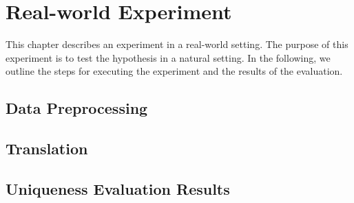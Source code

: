 \chapter{Real-world Experiment}
\label{ch:Real_Experiment}


This chapter describes an experiment in a real-world setting. The purpose of this experiment is to test the hypothesis in a natural setting. In the following, we outline the steps for executing the
experiment and the results of the evaluation.

\section{Data Preprocessing}
\label{sec:Real_Experiment:Preprocessing}





\section{Translation}
\label{sec:Real_Experiment:Translation}


\section{Uniqueness Evaluation Results}
\label{sec:Real_Experiment:Results}


